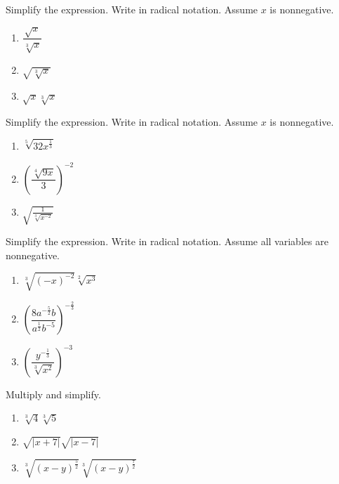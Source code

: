 \documentclass[en,12pt]{elegantbook}
\providecommand{\tightlist}{%
  \setlength{\itemsep}{0pt}\setlength{\parskip}{0pt}}
\let\BeginKnitrBlock\begin \let\EndKnitrBlock\end
\begin{document}
\BeginKnitrBlock{exercise}
\protect\hypertarget{exr:unnamed-chunk-105}{}{\label{exr:unnamed-chunk-105} }
Simplify the expression. Write in radical notation. Assume \(x\) is nonnegative.

\begin{enumerate}
\def\labelenumi{\arabic{enumi}.}
\tightlist
\item
  \(\dfrac{\sqrt{x}}{\sqrt[3]{x}}\)
\item
  \(\sqrt{\sqrt[3]{x}}\)
\item
  \(\sqrt{x}\sqrt[3]{x}\)
\end{enumerate}
\EndKnitrBlock{exercise}

\BeginKnitrBlock{exercise}
\protect\hypertarget{exr:unnamed-chunk-106}{}{\label{exr:unnamed-chunk-106} }
Simplify the expression. Write in radical notation. Assume \(x\) is nonnegative.

\begin{enumerate}
\def\labelenumi{\arabic{enumi}.}
\tightlist
\item
  \(\sqrt[5]{32x^{\frac13}}\)
\item
  \(\left(\dfrac{\sqrt[4]{9x}}{3}\right)^{-2}\)
\item
  \(\sqrt{\frac{1}{\sqrt[3]{x^{-2}}}}\)
\end{enumerate}
\EndKnitrBlock{exercise}

\BeginKnitrBlock{exercise}
\protect\hypertarget{exr:unnamed-chunk-107}{}{\label{exr:unnamed-chunk-107} }
Simplify the expression. Write in radical notation. Assume all variables are nonnegative.

\begin{enumerate}
\def\labelenumi{\arabic{enumi}.}
\tightlist
\item
  \(\sqrt[3]{(-x)^{-2}}\sqrt[2]{x^3}\)
\item
  \(\left(\dfrac{8a^{-\frac{5}{2}}b}{a^{\frac12}b^{-5}}\right)^{-\frac23}\)
\item
  \(\left(\dfrac{y^{-\frac{1}{3}}}{\sqrt[3]{x^{2}}}\right)^{-3}\)
\end{enumerate}
\EndKnitrBlock{exercise}

\BeginKnitrBlock{exercise}
\protect\hypertarget{exr:unnamed-chunk-108}{}{\label{exr:unnamed-chunk-108} }
Multiply and simplify.

\begin{enumerate}
\def\labelenumi{\arabic{enumi}.}
\tightlist
\item
  \(\sqrt[3]{4}\sqrt[3]{5}\)
\item
  \(\sqrt{|x+7|}\sqrt{|x-7|}\)
\item
  \(\sqrt[3]{(x-y)^{\frac52}}\sqrt[3]{(x-y)^{\frac72}}\)
\end{enumerate}
\EndKnitrBlock{exercise}
\end{document}
